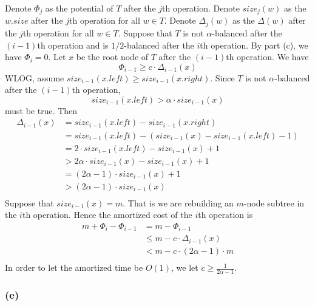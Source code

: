 Denote $\Phi_j$ as the potential of $T$ after the $j$th operation.
Denote $size_j(w)$ as the $w.size$ after the $j$th operation 
for all $w \in T$.
Denote $\Delta_j(w)$ as the $\Delta(w)$ after the $j$th operation 
for all $w \in T$.
Suppose that $T$ is not $\alpha$-balanced after the $(i-1)$th operation
and is $1/2$-balanced after the $i$th operation.
By part (c), we have $\Phi_i = 0$.
Let $x$ be the root node of $T$ after the $(i-1)$th operation.
We have
\begin{equation*}
    \Phi_{i-1} \geq c \cdot \Delta_{i-1}(x)
\end{equation*}
WLOG, assume $size_{i-1}(x.left) \geq size_{i-1}(x.right)$.
Since $T$ is not $\alpha$-balanced after the $(i-1)$th operation,
\begin{equation*}
    size_{i-1}(x.left) > \alpha \cdot size_{i-1}(x)
\end{equation*}
must be true.
Then
\begin{equation*}
\begin{split}
    \Delta_{i-1}(x) & = size_{i-1}(x.left) - size_{i-1}(x.right) \\
    & = size_{i-1}(x.left) - (size_{i-1}(x) - size_{i-1}(x.left) - 1) \\
    & = 2 \cdot size_{i-1}(x.left) - size_{i-1}(x) + 1 \\
    & > 2 \alpha \cdot size_{i-1}(x) - size_{i-1}(x) + 1 \\
    & = (2 \alpha - 1) \cdot size_{i-1}(x) + 1 \\
    & > (2 \alpha - 1) \cdot size_{i-1}(x) \\
\end{split}
\end{equation*}
Suppose that $size_{i-1}(x) = m$.
That is we are rebuilding an $m$-node subtree in the $i$th operation.
Hence the amortized cost of the $i$th operation is 
\begin{equation*}
\begin{split}
    m + \Phi_i - \Phi_{i-1} & = m - \Phi_{i-1} \\
    & \leq m - c \cdot \Delta_{i-1}(x) \\
    & < m - c \cdot (2 \alpha - 1) \cdot m \\
\end{split}
\end{equation*}
In order to let the amortized time be $O(1)$,
we let $c \geq \frac{1}{2 \alpha - 1}$.

\subsubsection*{(e)}

